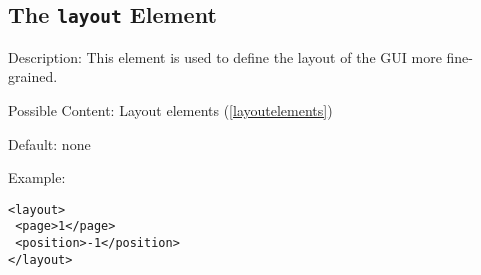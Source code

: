 \subsection{ The \texttt{layout} Element}
\label{layout}
\begin{description}
 \item Description: This element is used to define the layout of the GUI more fine-grained.

 \item Possible Content: Layout elements (\ref{layoutelements})

 \item Default: none

 \item Example: 

\begin{lstlisting}[caption=\texttt{layout} Element]
<layout>
 <page>1</page>
 <position>-1</position>
</layout>
\end{lstlisting}
\end{description}